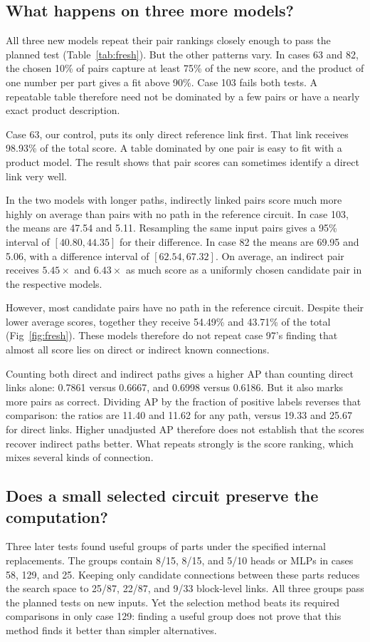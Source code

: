 \documentclass[11pt,letterpaper]{article}
\begin{document}
\subsection*{What happens on three more models?}
All three new models repeat their pair rankings closely enough to pass the
planned test (Table~\ref{tab:fresh}). But the other patterns vary. In cases 63
and 82, the chosen 10\% of pairs capture at least 75\% of the new score, and
the product of one number per part gives a fit above 90\%. Case 103 fails
both tests. A repeatable table therefore need not be dominated by a few pairs
or have a nearly exact product description.





Case 63, our control, puts its only direct reference link first. That link
receives 98.93\% of the total score. A table dominated by one pair is easy to
fit with a product model. The result shows that pair scores can sometimes
identify a direct link very well.

In the two models with longer paths, indirectly linked pairs score much more
highly on average than pairs with no path in the reference circuit. In case
103, the means are 47.54 and 5.11. Resampling the same input pairs gives a
95\% interval of $[40.80,44.35]$ for their difference. In case 82 the means
are 69.95 and 5.06, with a difference interval of $[62.54,67.32]$. On average,
an indirect pair receives $5.45\times$ and $6.43\times$ as much score as a
uniformly chosen candidate pair in the respective models.

However, most candidate pairs have no path in the reference circuit. Despite
their lower average scores, together they receive 54.49\% and 43.71\% of the
total (Fig~\ref{fig:fresh}). These models therefore do not repeat case 97's
finding that almost all score lies on direct or indirect known connections.



Counting both direct and indirect paths gives a higher AP than counting direct
links alone: 0.7861 versus 0.6667, and 0.6998 versus 0.6186. But it also marks
more pairs as correct. Dividing AP by the fraction of positive labels reverses
that comparison: the ratios are 11.40 and 11.62 for any path, versus 19.33 and
25.67 for direct links. Higher unadjusted AP therefore does not establish that
the scores recover indirect paths better. What repeats strongly is the score
ranking, which mixes several kinds of connection.

\subsection*{Does a small selected circuit preserve the computation?}
Three later tests found useful groups of parts under the specified internal
replacements. The groups contain 8/15, 8/15, and 5/10 heads or MLPs in cases
58, 129, and 25. Keeping only candidate connections between these parts reduces
the search space to 25/87, 22/87, and 9/33 block-level links. All three groups
pass the planned tests on new inputs. Yet the selection method beats its
required comparisons in only case 129: finding a useful group does not prove
that this method finds it better than simpler alternatives.
\end{document}
